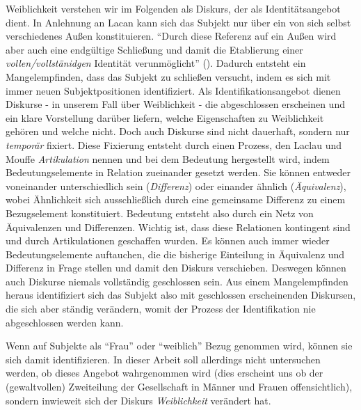 \documentclass[12pt, titlepage=true, toc=bib]{scrartcl}
\begin{document}
Weiblichkeit verstehen wir im Folgenden als Diskurs, der als Identitätsangebot dient. In Anlehnung an Lacan kann sich das Subjekt nur über ein von sich selbst verschiedenes Außen konstituieren. "`Durch diese Referenz auf ein Außen wird aber auch eine endgültige Schließung und damit die Etablierung einer \textit{vollen/vollstänidgen} Identität verunmöglicht"' (\cite[199; Hervorh. im Orig.]{nonhoff_kollektive_2007}). Dadurch entsteht ein Mangelempfinden, dass das Subjekt zu schließen versucht, indem es sich mit immer neuen Subjektpositionen identifiziert. Als Identifikationsangebot dienen Diskurse - in unserem Fall über Weiblichkeit - die abgeschlossen erscheinen und ein klare Vorstellung darüber liefern, welche Eigenschaften zu Weiblichkeit gehören und welche nicht. Doch auch Diskurse sind nicht dauerhaft, sondern nur \textit{temporär} fixiert. Diese Fixierung entsteht durch einen Prozess, den Laclau und Mouffe \textit{Artikulation} nennen und bei dem Bedeutung hergestellt wird, indem Bedeutungselemente in Relation zueinander gesetzt werden. Sie können entweder voneinander unterschiedlich sein (\textit{Differenz}) oder einander ähnlich (\textit{Äquivalenz}), wobei Ähnlichkeit sich ausschließlich durch eine gemeinsame Differenz zu einem Bezugselement konstituiert. Bedeutung entsteht also durch ein Netz von Äquivalenzen und Differenzen. Wichtig ist, dass diese Relationen kontingent sind und durch Artikulationen geschaffen wurden. Es können auch immer wieder Bedeutungselemente auftauchen, die die bisherige Einteilung in Äquivalenz und Differenz in Frage stellen und damit den Diskurs verschieben. Deswegen können auch Diskurse niemals vollständig geschlossen sein. Aus einem Mangelempfinden heraus identifiziert sich das Subjekt also mit geschlossen erscheinenden Diskursen, die sich aber ständig verändern, womit der Prozess der Identifikation nie abgeschlossen werden kann.


Wenn auf Subjekte als "`Frau"' oder "`weiblich"' Bezug genommen wird, können sie sich damit identifizieren. In dieser Arbeit soll allerdings nicht untersuchen werden, ob dieses Angebot wahrgenommen wird (dies erscheint uns ob der (gewaltvollen) Zweiteilung der Gesellschaft in Männer und Frauen offensichtlich), sondern inwieweit sich der Diskurs \textit{Weiblichkeit} verändert hat. 
\end{document}
